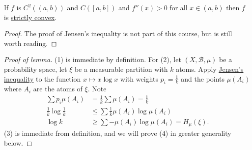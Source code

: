 \documentclass{article}
\newcommand{\named}[1]{\textbf{#1}\index{#1}}
\begin{document}
\begin{remark}
  If $f$ is $C^2((a,b))$ and $C([a,b])$ and $f''(x)>0$ for all $x \in (a,b)$ then $f$ is \hyperlink{def:convex}{strictly convex}.
\end{remark}
\begin{proof}
  The proof of Jensen's inequality is not part of this course, but is still worth reading.
\end{proof}
\begin{proof}[Proof of lemma]
  (1) is immediate by definition.
  For (2), let $(X, \mathcal{B},\mu)$ be a probability space, let $\xi$ be a measurable partition with $k$ atoms.
  Apply \hyperlink{lem:jensen}{Jensen's inequality} to the function $x \mapsto x \log x$ with weights $p_i = \frac{1}{k}$ and the points $\mu(A_i)$ where $A_i$ are the atoms of $\xi$.
  Note
  \begin{align*}
    \sum p_i \mu(A_i) &= \frac{1}{k} \sum \mu(A_i) = \frac{1}{k} \\
    \frac{1}{k} \log \frac{1}{k} &\leq \sum \frac{1}{k} \mu(A_i) \log \mu(A_i) \\
    \log k &\geq \sum -\mu(A_i) \log \mu(A_i) = H_\mu(\xi).
  \end{align*}
  (3) is immediate from definition, and we will prove (4) in greater generality below.
\end{proof}
\end{document}
